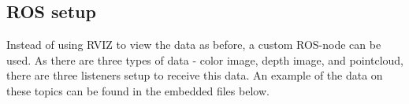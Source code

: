 \documentclass[11pt]{article}
\begin{document}
\subsection{ROS setup}
Instead of using RVIZ to view the data as before, a custom ROS-node can be used. As there are three types of data - color image, depth image, and pointcloud, there are three listeners setup to receive this data. An example of the data on these topics can be found in the embedded files below. \par

\begin{center}
\end{center}
\end{document}
